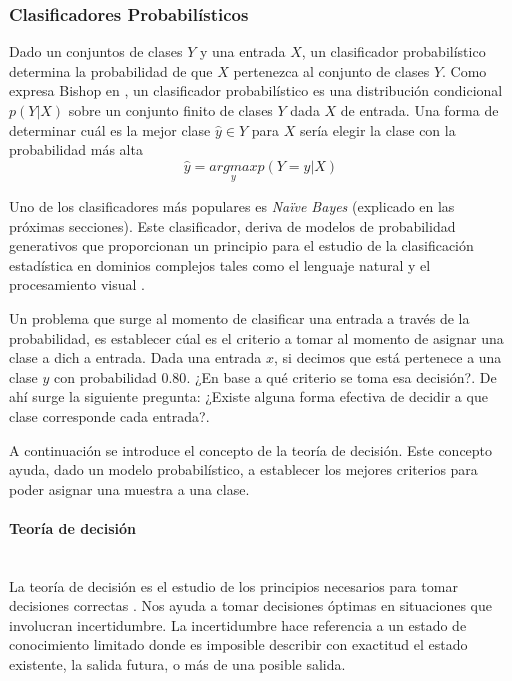 \subsubsection{Clasificadores Probabilísticos}
\label{subsubsection:clas_prob}

	Dado un conjuntos de clases $Y$ y una entrada $X$, un clasificador probabilístico determina la probabilidad de que $X$ pertenezca al conjunto de clases $Y$. Como expresa Bishop en \cite{Bis07}, un clasificador probabilístico es una distribución condicional $p(Y|X)$ sobre un conjunto finito de clases $Y$ dada $X$ de entrada. Una forma de determinar cuál es la mejor clase $\hat{y} \in Y$ para $X$ sería elegir la clase con la probabilidad más alta
	$$\hat{y} = \underset{y}{argmax}p(Y=y|X) $$
	
	Uno de los clasificadores más populares es \textit{Na\"{i}ve Bayes} (explicado en las próximas secciones). Este clasificador, deriva de modelos de probabilidad generativos que proporcionan un principio para el estudio de la clasificación estadística en dominios complejos tales como el lenguaje natural y el procesamiento visual \cite{GargRo01}.
	
	Un problema que surge al momento de clasificar una entrada a través de la probabilidad, es establecer cúal es el criterio a tomar al momento de asignar una clase a dich	a entrada. Dada una entrada $x$, si decimos que está pertenece a una clase $y$ con probabilidad $0.80$. ¿En base a qué criterio se toma esa decisión?. De ahí surge la siguiente pregunta: ¿Existe alguna forma efectiva de decidir a que clase corresponde cada entrada?.
	
	 A continuación se introduce el concepto de la teoría de decisión. Este concepto ayuda, dado un modelo probabilístico, a establecer los mejores criterios para poder asignar una muestra a una clase.
	
 \paragraph{Teoría de decisión} ~\\
	
	La teoría de decisión es el estudio de los principios necesarios para tomar decisiones correctas \cite{Hansson05}. Nos ayuda a tomar decisiones óptimas en situaciones que involucran incertidumbre. La incertidumbre hace referencia a un estado de conocimiento limitado donde es imposible describir con exactitud el estado existente, la salida futura, o más de una posible salida.
	
